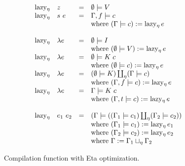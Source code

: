 \documentclass[conference]{IEEEtran}
\DeclareMathOperator{\lazyeta}{lazy_\eta}
\begin{document}
\begin{figure}
    \begin{equation*}
        \begin{array}{l l l l}
            \lazyeta & z         & = & \emptyset \models V                                                          \\
            \lazyeta & s \ e     & = & \Gamma,f \models c                                                           \\
                     &           &   & \text{where } (\Gamma \models c) := \lazyeta e                               \\
            \\
            \lazyeta & \lambda e & = & \emptyset \models I                                                          \\
                     &           &   & \text{where } (\emptyset \models V) := \lazyeta e                            \\
            \lazyeta & \lambda e & = & \emptyset \models K \; c                                                     \\
                     &           &   & \text{where } (\emptyset \models c) := \lazyeta e                            \\
            \lazyeta & \lambda e & = & (\emptyset \models K) \coprod_\eta (\Gamma \models c)                        \\
                     &           &   & \text{where } (\Gamma,f \models c) := \lazyeta e                             \\
            \lazyeta & \lambda e & = & \Gamma \models K \; c                                                        \\
                     &           &   & \text{where } (\Gamma,t \models c) := \lazyeta e                             \\
            \\
            \lazyeta & e_1 \ e_2 & = & (\Gamma \models ((\Gamma_1 \models c_1) \coprod_\eta (\Gamma_2 \models c_2)) \\
                     &           &   & \text{where } (\Gamma_1 \models c_1) := \lazyeta e_1                         \\
                     &           &   & \text{where } (\Gamma_2 \models c_2) := \lazyeta e_2                         \\
                     &           &   & \text{where } \Gamma := \Gamma_1 \sqcup_\eta \Gamma_2                        \\
        \end{array}
    \end{equation*}
    \centering
    \caption{Compilation function with Eta optimization.}
    \label{fig:lazyeta}
\end{figure}
\end{document}

